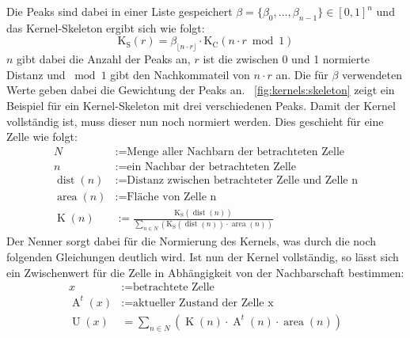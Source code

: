 Die Peaks sind dabei in einer Liste gespeichert $\beta = \{\beta_0, ..., \beta_{n-1}\} \in [0,1]^n$ und das Kernel-Skeleton ergibt sich wie folgt:
\[
    \operatorname{K_S}(r) = \beta_{\lfloor n \cdot r \rfloor} \cdot \operatorname{K_C}(n \cdot r \bmod 1)
\]
$n$ gibt dabei die Anzahl der Peaks an, $r$ ist die zwischen 0 und 1 normierte Distanz und $\bmod 1$ gibt den Nachkommateil von $n \cdot r$ an.
Die für $\beta$ verwendeten Werte geben dabei die Gewichtung der Peaks an. ~\autoref{fig:kernels:skeleton} zeigt ein Beispiel für ein Kernel-Skeleton mit drei verschiedenen Peaks.
Damit der Kernel vollständig ist, muss dieser nun noch normiert werden. Dies geschieht für eine Zelle wie folgt:
\[
    \begin{aligned}
        N                      & := \text{Menge aller Nachbarn der betrachteten Zelle}                                                                                                     \\
        n                      & := \text{ein Nachbar der betrachteten Zelle}                                                                                                              \\
        \operatorname{dist}(n) & := \text {Distanz zwischen betrachteter Zelle und Zelle n}                                                                                                \\
        \operatorname{area}(n) & := \text {Fläche von Zelle n}                                                                                                                             \\
        \operatorname{K}(n)    & := \frac{\operatorname{K_S}(\operatorname{dist}(n))}{\sum_{n \in N} \left(\operatorname{K_S}(\operatorname{dist}(n)) \cdot \operatorname{area}(n)\right)}
    \end{aligned}
\]
Der Nenner sorgt dabei für die Normierung des Kernels, was durch die noch folgenden Gleichungen deutlich wird.
Ist nun der Kernel vollständig, so lässt sich ein Zwischenwert für die Zelle in Abhängigkeit von der Nachbarschaft bestimmen:
\[
    \begin{aligned}
        x                     & := \text{betrachtete Zelle}                                                                                \\
        \operatorname{A}^t(x) & := \text{aktueller Zustand der Zelle x}                                                                    \\
        \operatorname{U}(x)   & = \sum_{n \in N} \left(\operatorname{K}(n) \cdot \operatorname{A}^t(n) \cdot \operatorname{area}(n)\right)
    \end{aligned}
\]
